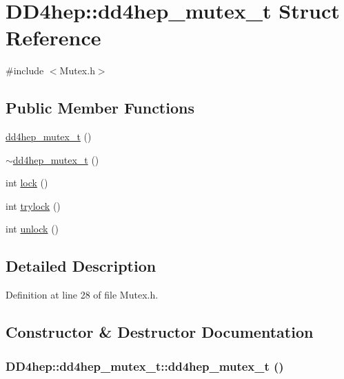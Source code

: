 \hypertarget{struct_d_d4hep_1_1dd4hep__mutex__t}{
\section{DD4hep::dd4hep\_\-mutex\_\-t Struct Reference}
\label{struct_d_d4hep_1_1dd4hep__mutex__t}
}


{\ttfamily \#include $<$Mutex.h$>$}\subsection*{Public Member Functions}
\begin{DoxyCompactItemize}
\item 
\hyperlink{struct_d_d4hep_1_1dd4hep__mutex__t_a9468728fad83735ab6a3a52157519a3e}{dd4hep\_\-mutex\_\-t} ()
\item 
\hyperlink{struct_d_d4hep_1_1dd4hep__mutex__t_addd31c44ebdd2c7097c4778b3f2b9cb8}{$\sim$dd4hep\_\-mutex\_\-t} ()
\item 
int \hyperlink{struct_d_d4hep_1_1dd4hep__mutex__t_a7d871d008c53d730b892d64cf0b49e29}{lock} ()
\item 
int \hyperlink{struct_d_d4hep_1_1dd4hep__mutex__t_a71b8088c0188d51c0433eda5556e4189}{trylock} ()
\item 
int \hyperlink{struct_d_d4hep_1_1dd4hep__mutex__t_af41a64ce1a44de41262fb127d4737d34}{unlock} ()
\end{DoxyCompactItemize}


\subsection{Detailed Description}


Definition at line 28 of file Mutex.h.

\subsection{Constructor \& Destructor Documentation}
\hypertarget{struct_d_d4hep_1_1dd4hep__mutex__t_a9468728fad83735ab6a3a52157519a3e}{
\subsubsection[{dd4hep\_\-mutex\_\-t}]{\setlength{\rightskip}{0pt plus 5cm}DD4hep::dd4hep\_\-mutex\_\-t::dd4hep\_\-mutex\_\-t ()}}
\label{struct_d_d4hep_1_1dd4hep__mutex__t_a9468728fad83735ab6a3a52157519a3e}


